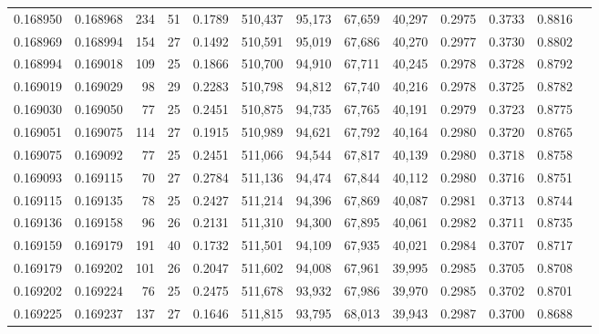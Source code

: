 \begin{tabular}{rrrrrrrrrrrrr}
0.168950 & 0.168968 & 234 &  51 &                                     0.1789 & 510,437 &  95,173 &  67,659 &  40,297 & 0.2975 & 0.3733 & 0.8816 \\
0.168969 & 0.168994 & 154 &  27 &                                     0.1492 & 510,591 &  95,019 &  67,686 &  40,270 & 0.2977 & 0.3730 & 0.8802 \\
0.168994 & 0.169018 & 109 &  25 &                                     0.1866 & 510,700 &  94,910 &  67,711 &  40,245 & 0.2978 & 0.3728 & 0.8792 \\
0.169019 & 0.169029 &  98 &  29 &                                     0.2283 & 510,798 &  94,812 &  67,740 &  40,216 & 0.2978 & 0.3725 & 0.8782 \\
0.169030 & 0.169050 &  77 &  25 &                                     0.2451 & 510,875 &  94,735 &  67,765 &  40,191 & 0.2979 & 0.3723 & 0.8775 \\
0.169051 & 0.169075 & 114 &  27 &                                     0.1915 & 510,989 &  94,621 &  67,792 &  40,164 & 0.2980 & 0.3720 & 0.8765 \\
0.169075 & 0.169092 &  77 &  25 &                                     0.2451 & 511,066 &  94,544 &  67,817 &  40,139 & 0.2980 & 0.3718 & 0.8758 \\
0.169093 & 0.169115 &  70 &  27 &                                     0.2784 & 511,136 &  94,474 &  67,844 &  40,112 & 0.2980 & 0.3716 & 0.8751 \\
0.169115 & 0.169135 &  78 &  25 &                                     0.2427 & 511,214 &  94,396 &  67,869 &  40,087 & 0.2981 & 0.3713 & 0.8744 \\
0.169136 & 0.169158 &  96 &  26 &                                     0.2131 & 511,310 &  94,300 &  67,895 &  40,061 & 0.2982 & 0.3711 & 0.8735 \\
0.169159 & 0.169179 & 191 &  40 &                                     0.1732 & 511,501 &  94,109 &  67,935 &  40,021 & 0.2984 & 0.3707 & 0.8717 \\
0.169179 & 0.169202 & 101 &  26 &                                     0.2047 & 511,602 &  94,008 &  67,961 &  39,995 & 0.2985 & 0.3705 & 0.8708 \\
0.169202 & 0.169224 &  76 &  25 &                                     0.2475 & 511,678 &  93,932 &  67,986 &  39,970 & 0.2985 & 0.3702 & 0.8701 \\
0.169225 & 0.169237 & 137 &  27 &                                     0.1646 & 511,815 &  93,795 &  68,013 &  39,943 & 0.2987 & 0.3700 & 0.8688 \\

\end{tabular}
